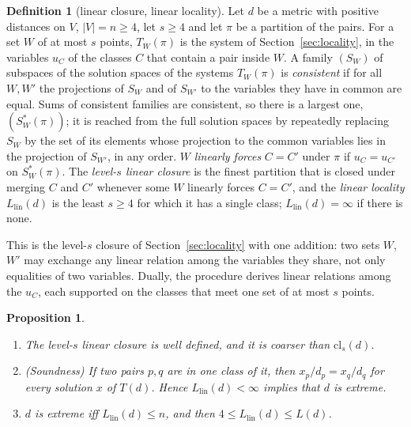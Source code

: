 \documentclass[11pt,a4paper]{article}
\newtheorem{proposition}[theorem]{Proposition}
\theoremstyle{definition}
\newtheorem*{definition}{Definition}
\theoremstyle{remark}
\newcommand{\cl}{\mathrm{cl}}
\begin{document}
\begin{definition}[linear closure, linear locality]
Let $d$ be a metric with positive distances on $V$, $|V| = n \ge 4$, let $s \ge 4$ and let $\pi$ be a partition of
the pairs. For a set $W$ of at most $s$ points, $T_W(\pi)$ is the system of Section~\ref{sec:locality}, in the
variables $u_C$ of the classes $C$ that contain a pair inside $W$. A family $(S_W)$ of subspaces of the solution
spaces of the systems $T_W(\pi)$ is \emph{consistent} if for all $W, W'$ the projections of $S_W$ and of $S_{W'}$
to the variables they have in common are equal. Sums of consistent families are consistent, so there is a largest
one, $(S^*_W(\pi))$; it is reached from the full solution spaces by repeatedly replacing $S_W$ by the set of its
elements whose projection to the common variables lies in the projection of $S_{W'}$, in any order. $W$
\emph{linearly forces} $C = C'$ under $\pi$ if $u_C = u_{C'}$ on $S^*_W(\pi)$. The \emph{level-$s$ linear closure}
is the finest partition that is closed under merging $C$ and $C'$ whenever some $W$ linearly forces $C = C'$, and
the \emph{linear locality} $L_{\mathrm{lin}}(d)$ is the least $s \ge 4$ for which it has a single class;
$L_{\mathrm{lin}}(d) = \infty$ if there is none.
\end{definition}

This is the level-$s$ closure of Section~\ref{sec:locality} with one addition: two sets $W$, $W'$ may exchange any
linear relation among the variables they share, not only equalities of two variables. Dually, the procedure derives
linear relations among the $u_C$, each supported on the classes that meet one set of at most $s$ points.

\begin{proposition}\label{prop:lin}
\begin{enumerate}[label=\textup{(\roman*)},leftmargin=*]
\item The level-$s$ linear closure is well defined, and it is coarser than $\cl_s(d)$.
\item (Soundness) If two pairs $p, q$ are in one class of it, then $x_p/d_p = x_q/d_q$ for every solution $x$ of
  $T(d)$. Hence $L_{\mathrm{lin}}(d) < \infty$ implies that $d$ is extreme.
\item $d$ is extreme iff $L_{\mathrm{lin}}(d) \le n$, and then $4 \le L_{\mathrm{lin}}(d) \le L(d)$.
\end{enumerate}
\end{proposition}
\end{document}
